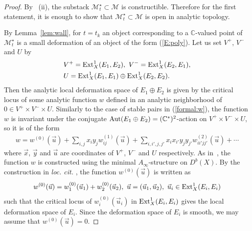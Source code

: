 \documentclass[11pt]{amsart}
\theoremstyle{plain}
\newcommand{\mM}{\mathcal{M}}
\newcommand{\Ext}{\mathop{\rm Ext}\nolimits}
\newcommand{\Aut}{\mathop{\rm Aut}\nolimits}
\begin{document}
\begin{proof}
By~\cite[Lemma~4.13]{TodK3} (ii), 
the substack $\mM_t^{\star} \subset \mM$
is constructible. Therefore 
for the first statement, 
it is enough to show that $\mM_t^{\star} \subset \mM$ is open in 
analytic topology. 

By Lemma~\ref{lem:wall}, 
for $t=t_k$ 
an object corresponding to 
a $\mathbb{C}$-valued point of 
$\mM_t^{\star}$ is a small deformation of an
object of the form (\ref{E:poly}). 
Let us set $V^+$, $V^-$ and $U$ 
by
\begin{align*}
&V^+=\Ext_X^1(E_1, E_2), \ V^-=\Ext_X^1(E_2, E_1), \\ 
&U=\Ext_X^1(E_1, E_1) \oplus \Ext_X^1(E_2, E_2).
\end{align*}
Then the analytic local deformation 
space of $E_1 \oplus E_2$ is given by the critical locus of 
some analytic function $w$ 
defined in an analytic neighborhood of $0 \in
V^+ \times V^- \times U$. 
Similarly to the case of stable pairs in (\ref{formal:w}), 
the function 
$w$ is
invariant under the
conjugate $\Aut(E_1 \oplus E_2)=(\mathbb{C}^{\ast})^2$-action 
on $V^+ \times V^- \times U$, 
so it is
 of the form
\begin{align*}
w=w^{(0)}(\vec{u})+\sum_{i, j}x_i y_j w_{ij}^{(1)}(\vec{u})
+\sum_{i, i', j, j'}x_i x_{i'} y_j y_{j'} w_{i i' j j'}^{(2)}(\vec{u}) +\cdots
\end{align*}
where $\vec{x}$, $\vec{y}$ and $\vec{u}$ are 
coordinates of $V^+$, $V^-$ and $U$
respectively. 
As in~\cite[Subsection~5.1]{Toddbir}, 
the function $w$ is constructed using 
the minimal $A_{\infty}$-structure on $D^b(X)$. 
By the construction in \textit{loc. cit. }, the function 
$w^{(0)}(\vec{u})$ is written as 
\begin{align*}
w^{(0)}(\vec{u})=
w^{(0)}_1(\vec{u}_1)+w^{(0)}_2(\vec{u}_2), \ 
\vec{u}=(\vec{u}_1, \vec{u}_2), \ 
\vec{u}_i  \in \Ext_X^1(E_i, E_i)
\end{align*}
such that the critical locus of 
$w^{(0)}_i(\vec{u}_i)$ 
in $\Ext_X^1(E_i, E_i)$
gives the 
local deformation space of $E_i$. 
Since the deformation space of $E_i$ 
is smooth, we may assume that $w^{(0)}(\vec{u})=0$. 


\end{proof}
\end{document}
